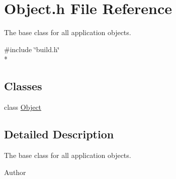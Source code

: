 \section{Object.\-h File Reference}
\label{_object_8h}


The base class for all application objects.  


{\ttfamily \#include \char`\"{}build.\-h\char`\"{}}\\*
\subsection*{Classes}
\begin{DoxyCompactItemize}
\item 
class \hyperlink{class_object}{Object}
\end{DoxyCompactItemize}


\subsection{Detailed Description}
The base class for all application objects. \begin{DoxyAuthor}{Author}

\end{DoxyAuthor}
